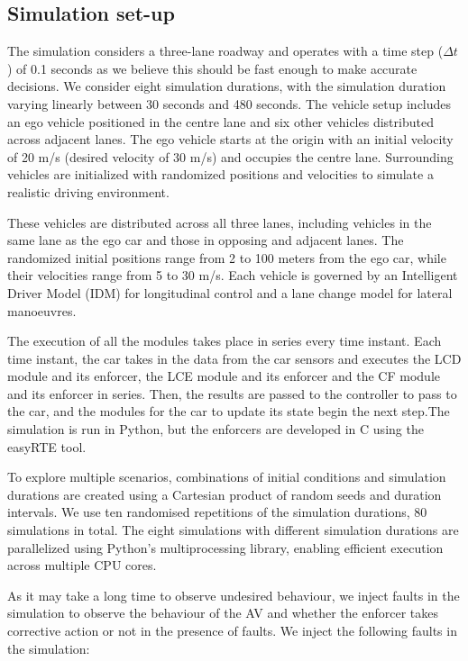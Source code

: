 \subsection{Simulation set-up}

The simulation considers a three-lane roadway and operates with a time step ($\Delta t$) of 0.1 seconds as we believe this should be fast enough to make accurate decisions. We consider eight simulation durations, with the simulation duration varying linearly between 30 seconds and 480 seconds. The vehicle setup includes an ego vehicle positioned in the centre lane and six other vehicles distributed across adjacent lanes. The ego vehicle starts at the origin with an initial velocity of 20 m/s (desired velocity of 30 m/s) and occupies the centre lane. Surrounding vehicles are initialized with randomized positions and velocities to simulate a realistic driving environment. 

These vehicles are distributed across all three lanes, including vehicles in the same lane as the ego car and those in opposing and adjacent lanes. The randomized initial positions range from 2 to 100 meters from the ego car, while their velocities range from 5 to 30 m/s. Each vehicle is governed by an Intelligent Driver Model (IDM) for longitudinal control and a lane change model for lateral manoeuvres.

The execution of all the modules takes place in series every time instant. Each time instant, the car takes in the data from the car sensors and executes the LCD module and its enforcer, the LCE module and its enforcer and the CF module and its enforcer in series. Then, the results are passed to the controller to pass to the car, and the modules for the car to update its state begin the next step.The simulation is run in Python, but the enforcers are developed in C using the easyRTE tool.

To explore multiple scenarios, combinations of initial conditions and simulation durations are created using a Cartesian product of random seeds and duration intervals. We use ten randomised repetitions of the simulation durations, 80 simulations in total. The eight simulations with different simulation durations are parallelized using Python's multiprocessing library, enabling efficient execution across multiple CPU cores. 

As it may take a long time to observe undesired behaviour, we inject faults in the simulation to observe the behaviour of the AV  and whether the enforcer takes corrective action or not in the presence of faults. We inject the following faults in the simulation:

